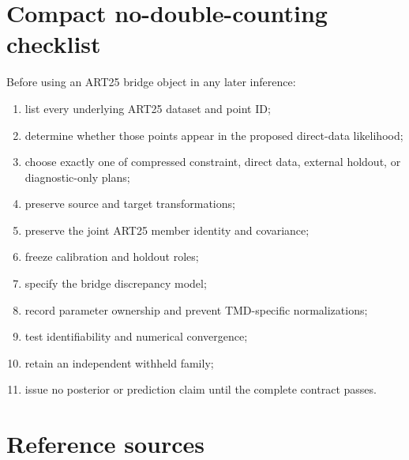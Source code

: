 \documentclass[11pt]{article}
\begin{document}
\section{Compact no-double-counting checklist}
\label{app:no-double-counting}

Before using an ART25 bridge object in any later inference:
\begin{enumerate}
\item list every underlying ART25 dataset and point ID;
\item determine whether those points appear in the proposed direct-data likelihood;
\item choose exactly one of compressed constraint, direct data, external holdout, or diagnostic-only plans;
\item preserve source and target transformations;
\item preserve the joint ART25 member identity and covariance;
\item freeze calibration and holdout roles;
\item specify the bridge discrepancy model;
\item record parameter ownership and prevent TMD-specific normalizations;
\item test identifiability and numerical convergence;
\item retain an independent withheld family;
\item issue no posterior or prediction claim until the complete contract passes.
\end{enumerate}

\section{Reference sources}
\label{app:references}
\end{document}
